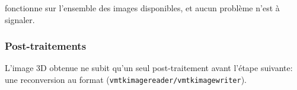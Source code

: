 

	\subsubsection{\etatg}
\rorpo fonctionne sur l'ensemble des images disponibles, et aucun problème n'est à signaler.

	\subsubsection{Post-traitements}

L'image 3D obtenue ne subit qu'un seul post-traitement avant l'étape suivante: une reconversion au format \mha (\texttt{vmtkimagereader/vmtkimagewriter}).



